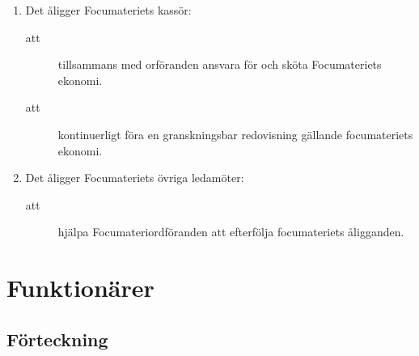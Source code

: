 \documentclass[11pt,a4paper]{article}
\begin{document}
\begin{enumerate}[\thesubsection .1]
\begin{description}
    \end{description}


  \item Det åligger Focumateriets kassör:
    \begin{description}
      \item[att] tillsammans med orföranden ansvara för och sköta Focumateriets ekonomi.
      \item[att] kontinuerligt föra en granskningsbar redovisning gällande focumateriets ekonomi.
    \end{description}

  \item Det åligger Focumateriets övriga ledamöter:
    \begin{description}
      \item[att] hjälpa Focumateriordföranden att efterfölja focumateriets åligg\-and\-en.
    \end{description}

\end{enumerate}

\newpage

\section{Funktionärer}

\subsection{Förteckning}
\end{document}
